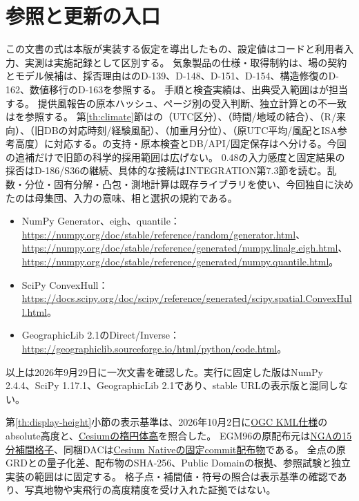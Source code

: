 \documentclass[11pt,a4paper]{article}
\begin{document}
\section{参照と更新の入口}\label{th:references}
この文書の式は本版が実装する仮定を導出したもの、設定値はコードと利用者入力、実測は実施記録として区別する。
気象製品の仕様・取得制約は、場の契約とモデル候補は、採否理由はのD-139、D-148、D-151、D-154、構造修復のD-162、数値移行のD-163を参照する。
手順と検査実績は、出典受入範囲はが担当する。
提供風報告の原本ハッシュ、ページ別の受入判断、独立計算との不一致はを参照する。
第\ref{th:climate}節はの（UTC区分）、（時間/地域の結合）、（R/来向）、（旧DBの対応時刻/経験風配）、（加重月分位）、（原UTC平均/風配とISA参考高度）に対応する。の支持・原本検査とDB/API/固定保存はへ分ける。今回の追補だけで旧節の科学的採用範囲は広げない。
0.48の入力感度と固定結果の採否はD-186/S36の継続、具体的な接続はINTEGRATION第7.3節を読む。乱数・分位・固有分解・凸包・測地計算は既存ライブラリを使い、今回独自に決めたのは母集団、入力の意味、相と選択の規約である。
\begin{itemize}
\item NumPy Generator、eigh、quantile：\url{https://numpy.org/doc/stable/reference/random/generator.html}、\url{https://numpy.org/doc/stable/reference/generated/numpy.linalg.eigh.html}、\url{https://numpy.org/doc/stable/reference/generated/numpy.quantile.html}。
\item SciPy ConvexHull：\url{https://docs.scipy.org/doc/scipy/reference/generated/scipy.spatial.ConvexHull.html}。
\item GeographicLib 2.1のDirect/Inverse：\url{https://geographiclib.sourceforge.io/html/python/code.html}。
\end{itemize}
以上は2026年9月29日に一次文書を確認した。実行に固定した版はNumPy 2.4.4、SciPy 1.17.1、GeographicLib 2.1であり、stable URLの表示版と混同しない。

第\ref{th:display-height}小節の表示基準は、2026年10月2日に\href{https://docs.ogc.org/is/12-007r2/12-007r2.html}{OGC KML仕様}のabsolute高度と、\href{https://cesium.com/learn/cesiumjs/ref-doc/Cartesian3.html#fromDegrees}{Cesiumの楕円体高}を照合した。
EGM96の原配布元は\href{https://earth-info.nga.mil/php/download.php?file=egm-96interpolation}{NGAの15分補間格子}、同梱DACは\href{https://github.com/CesiumGS/cesium-native/blob/1bca8021711294cc83a5a032599ac72d9b3166c9/data/WW15MGH.DAC}{Cesium Nativeの固定commit配布物}である。
全点の原GRDとの量子化差、配布物のSHA-256、Public Domainの根拠、参照試験と独立実装の範囲はに固定する。
格子点・補間値・符号の照合は表示基準の確認であり、写真地物や実飛行の高度精度を受け入れた証拠ではない。
\end{document}
